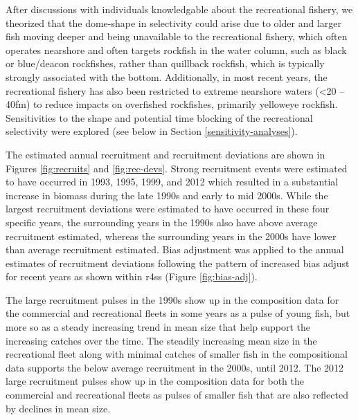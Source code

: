 \documentclass[11pt,
  english,
  a4paper,
]{article}
\begin{document}
After discussions with individuals knowledgable about the recreational fishery, we theorized that the dome-shape in selectivity could arise due to older and larger fish moving deeper and being unavailable to the recreational fishery, which often operates nearshore and often targets rockfish in the water column, such as black or blue/deacon rockfishes, rather than quillback rockfish, which is typically strongly associated with the bottom. Additionally, in most recent years, the recreational fishery has also been restricted to extreme nearshore waters (\textless20 -- 40fm) to reduce impacts on overfished rockfishes, primarily yelloweye rockfish. Sensitivities to the shape and potential time blocking of the recreational selectivity were explored (see below in Section \ref{sensitivity-analyses}).

\leavevmode\tagmcend\tagstructend\par


The estimated annual recruitment and recruitment deviations are shown in Figures \ref{fig:recruits} and \ref{fig:rec-devs}. Strong recruitment events were estimated to have occurred in 1993, 1995, 1999, and 2012 which resulted in a substantial increase in biomass during the late 1990s and early to mid 2000s. While the largest recruitment deviations were estimated to have occurred in these four specific years, the surrounding years in the 1990s also have above average recruitment estimated, whereas the surrounding years in the 2000s have lower than average recruitment estimated. Bias adjustment was applied to the annual estimates of recruitment deviations following the pattern of increased bias adjust for recent years as shown within r4ss (Figure \ref{fig:bias-adj}).

\leavevmode\tagmcend\tagstructend\par


The large recruitment pulses in the 1990s show up in the composition data for the commercial and recreational fleets in some years as a pulse of young fish, but more so as a steady increasing trend in mean size that help support the increasing catches over the time. The steadily increasing mean size in the recreational fleet along with minimal catches of smaller fish in the compositional data supports the below average recruitment in the 2000s, until 2012. The 2012 large recruitment pulses show up in the composition data for both the commercial and recreational fleets as pulses of smaller fish that are also reflected by declines in mean size.
\end{document}
